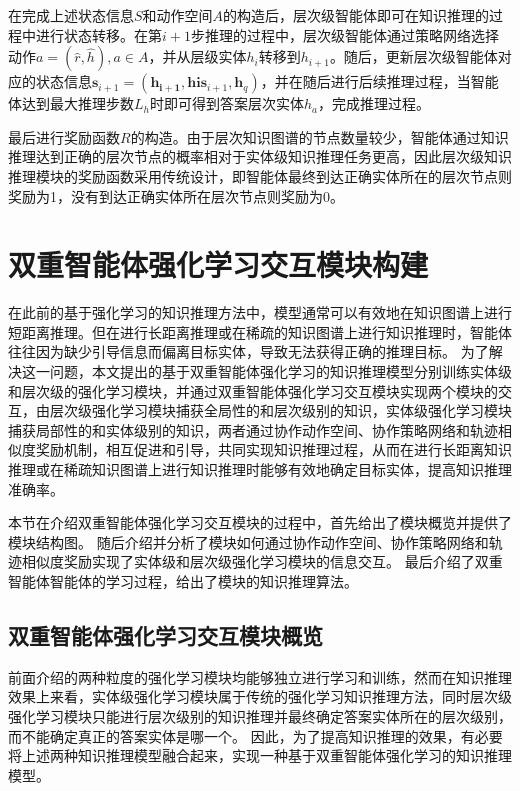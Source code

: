 \documentclass[algorithmlist, AutoFakeBold, AutoFakeSlant, figurelist, tablelist, nomlist, engineering]{seuthesix}
\begin{document}
在完成上述状态信息$S$和动作空间$A$的构造后，层次级智能体即可在知识推理的过程中进行状态转移。在第$i+1$步推理的过程中，层次级智能体通过策略网络选择动作$a = (\hat{r}, \hat{h}), a \in A$，并从层级实体$h_i$转移到$h_{i+1}$。随后，更新层次级智能体对应的状态信息$\bm{s}_{i+1} = (\bm{h_{i+1}}, \bm{his}_{i+1}, \bm{h}_q)$，并在随后进行后续推理过程，当智能体达到最大推理步数$L_h$时即可得到答案层次实体$h_a$，完成推理过程。

最后进行奖励函数$R$的构造。由于层次知识图谱的节点数量较少，智能体通过知识推理达到正确的层次节点的概率相对于实体级知识推理任务更高，因此层次级知识推理模块的奖励函数采用传统设计，即智能体最终到达正确实体所在的层次节点则奖励为1，没有到达正确实体所在层次节点则奖励为0。

\section{双重智能体强化学习交互模块构建}
在此前的基于强化学习的知识推理方法中，模型通常可以有效地在知识图谱上进行短距离推理。但在进行长距离推理或在稀疏的知识图谱上进行知识推理时，智能体往往因为缺少引导信息而偏离目标实体，导致无法获得正确的推理目标。
为了解决这一问题，本文提出的基于双重智能体强化学习的知识推理模型分别训练实体级和层次级的强化学习模块，并通过双重智能体强化学习交互模块实现两个模块的交互，由层次级强化学习模块捕获全局性的和层次级别的知识，实体级强化学习模块捕获局部性的和实体级别的知识，两者通过协作动作空间、协作策略网络和轨迹相似度奖励机制，相互促进和引导，共同实现知识推理过程，从而在进行长距离知识推理或在稀疏知识图谱上进行知识推理时能够有效地确定目标实体，提高知识推理准确率。

本节在介绍双重智能体强化学习交互模块的过程中，首先给出了模块概览并提供了模块结构图。
随后介绍并分析了模块如何通过协作动作空间、协作策略网络和轨迹相似度奖励实现了实体级和层次级强化学习模块的信息交互。
最后介绍了双重智能体智能体的学习过程，给出了模块的知识推理算法。

\subsection{双重智能体强化学习交互模块概览}
前面介绍的两种粒度的强化学习模块均能够独立进行学习和训练，然而在知识推理效果上来看，实体级强化学习模块属于传统的强化学习知识推理方法，同时层次级强化学习模块只能进行层次级别的知识推理并最终确定答案实体所在的层次级别，而不能确定真正的答案实体是哪一个。
因此，为了提高知识推理的效果，有必要将上述两种知识推理模型融合起来，实现一种基于双重智能体强化学习的知识推理模型。
\end{document}
